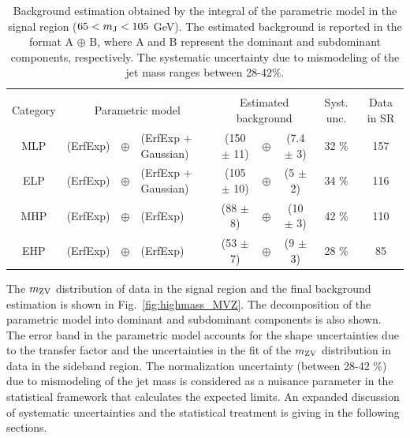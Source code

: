 \begin{landscape}
\begin{table}[p]
\begin{center}
\caption[Background estimation]{Background estimation obtained by the integral of the parametric model in the signal region ($65 < m_\mathrm{J} < 105$ GeV). The estimated background is reported in the format A $\oplus$ B, where A  and B represent the dominant and subdominant components, respectively. The systematic uncertainty due to mismodeling of the jet mass ranges between 28-42\%.}
\label{tab:bkgnormal}
\begin{tabular}{ c  ccl  ccc  c  c }
\hline\\[-0.3cm]
Category & \multicolumn{3}{c}{Parametric model}      &\multicolumn{3}{c}{Estimated background} & Syst. unc.      & Data in SR \\[0.1cm] \hline\hline 
   MLP     &   (ErfExp)  & $\oplus$ & (ErfExp + Gaussian)     &(150 $\pm$ 11) & $\oplus$ & (7.4 $\pm$ 3)            &          32 \%                &  157                \\ 
   ELP     &    (ErfExp)  & $\oplus$ & (ErfExp + Gaussian)    &(105 $\pm$ 10) & $\oplus$ & (5   $\pm$ 2)              &          34 \%                & 116                \\ 
   MHP     &   (ErfExp)  & $\oplus$ & (ErfExp)                       &(88 $\pm$ 8)     &$\oplus$  & (10 $\pm$ 3)               &          42 \%                & 110                \\ 
   EHP     &    (ErfExp)  & $\oplus$ & (ErfExp)                       &(53 $\pm$ 7)    & $\oplus$  & (9 $\pm$ 3)                 &          28 \%                & 85                  \\ \hline
\end{tabular}
\end{center}
\end{table}
\end{landscape}

\clearpage

The $m_\mathrm{ZV}$ distribution of data in the signal region and the final background estimation is shown in Fig.~\ref{fig:highmass_MVZ}. The decomposition of the parametric model into dominant and subdominant components is also shown. The error band in the parametric model accounts for the shape uncertainties due to the transfer factor and the uncertainties in the fit of the $m_\mathrm{ZV}$ distribution in data in the sideband region. The normalization uncertainty (between 28-42 \%) due to mismodeling of the jet mass is considered as a nuisance parameter in the statistical framework that calculates the expected limits. An expanded discussion of systematic uncertainties and the statistical treatment is giving in the following sections.

